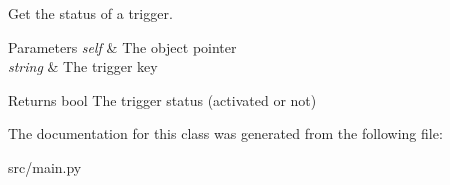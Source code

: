 Get the status of a trigger. 


\begin{DoxyParams}{Parameters}
{\em self} & The object pointer \\
\hline
{\em string} & The trigger key \\
\hline
\end{DoxyParams}
\begin{DoxyReturn}{Returns}
bool The trigger status (activated or not) 
\end{DoxyReturn}


The documentation for this class was generated from the following file\+:\begin{DoxyCompactItemize}
\item 
src/main.\+py\end{DoxyCompactItemize}
